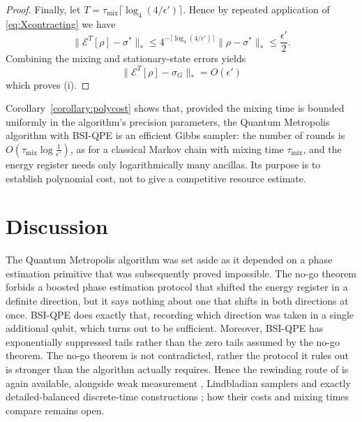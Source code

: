 \documentclass[aps,floatfix,10pt,amssymb,amsfont,amsmath,superscriptaddress,float,nofootinbib,longbibliography,nobalancelastpage,twocolumn]{revtex4-2}
\begin{document}
\begin{proof}
Finally, let $T=\tau_{\mathrm{mix}}\lceil\log_4(4/\epsilon')\rceil$. Hence by repeated application of \eqref{eq:Xcontracting} we have
\begin{equation}
    \|\mathcal{E}^T[\rho]-\sigma^*\|_*
    \leq 4^{-\lceil\log_4(4/\epsilon')\rceil}\|\rho-\sigma^*\|_*
    \leq  \frac{\epsilon'}{2}.
\end{equation}
Combining the mixing and stationary-state errors yields
\begin{equation}
    \|\mathcal{E}^T[\rho]-\sigma_G\|_* = O(\epsilon')
\end{equation}
which proves (i).
\end{proof}

Corollary~\ref{corollary:polycost} shows that, provided the mixing time is bounded uniformly in the algorithm's precision parameters, the Quantum Metropolis algorithm with BSI-QPE is an efficient Gibbs sampler: the number of rounds is $O(\tau_{\mathrm{mix}}\log\frac{1}{\epsilon'})$, as for a classical Markov chain with mixing time $\tau_{\mathrm{mix}}$, and the energy register needs only logarithmically many ancillas. Its purpose is to establish polynomial cost, not to give a competitive resource estimate. 

\section{Discussion}
\label{section:discussion}
The Quantum Metropolis algorithm was set aside as it depended on a phase
estimation primitive that was subsequently proved impossible. The no-go theorem \cite{chen2023quantumthermalstatepreparation} forbids a boosted phase estimation protocol that shifted the energy register in a definite direction, but it says nothing about one that shifts in both directions at once. BSI-QPE does exactly that, recording which direction was taken in a single additional qubit, which turns out to be sufficient. Moreover, BSI-QPE has exponentially suppressed tails rather than the zero tails assumed by the no-go theorem. The no-go theorem is not contradicted, rather the protocol it rules out is stronger than the algorithm actually requires. Hence the rewinding route of \cite{Temme_2011} is again available, alongside weak measurement \cite{jiang2024quantummetropolissamplingweak}, Lindbladian samplers and exactly detailed-balanced discrete-time constructions \cite{gilyen2024quantum}; how their costs and mixing times compare remains open.
\end{document}
